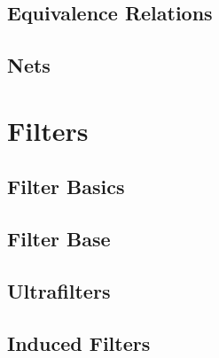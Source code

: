 \subsection{Equivalence Relations}

 

 



\subsection{Nets}






\section{Filters}
\subsection{Filter Basics}





\subsection{Filter Base}






\subsection{Ultrafilters}


\subsection{Induced Filters}


